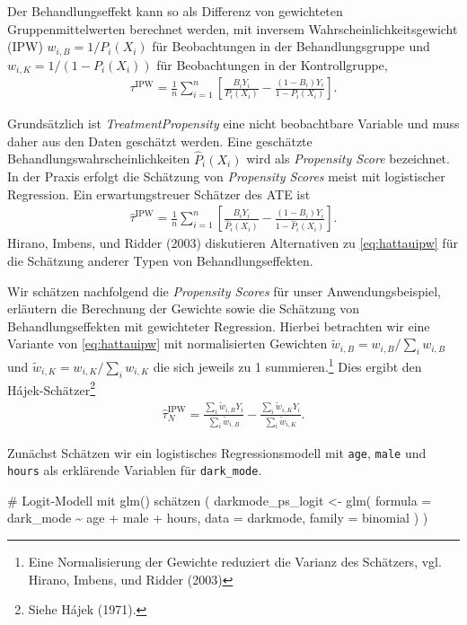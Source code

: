 \documentclass[
  a4paper,
  DIV=11,
  oneside]{scrreprt}
\newenvironment{Shaded}{\begin{snugshade}}{\end{snugshade}}
\newcommand{\AttributeTok}[1]{\textcolor[rgb]{0.40,0.45,0.13}{#1}}
\newcommand{\CommentTok}[1]{\textcolor[rgb]{0.37,0.37,0.37}{#1}}
\newcommand{\FunctionTok}[1]{\textcolor[rgb]{0.28,0.35,0.67}{#1}}
\newcommand{\NormalTok}[1]{\textcolor[rgb]{0.00,0.23,0.31}{#1}}
\newcommand{\OtherTok}[1]{\textcolor[rgb]{0.00,0.23,0.31}{#1}}
\newcommand{\SpecialCharTok}[1]{\textcolor[rgb]{0.37,0.37,0.37}{#1}}
\begin{document}
Der Behandlungseffekt kann so als Differenz von gewichteten
Gruppenmittelwerten berechnet werden, mit inversem
Wahrscheinlichkeitsgewicht (IPW) \(w_{i,B} = 1/P_i(X_i)\) für
Beobachtungen in der Behandlungsgruppe und \(w_{i,K} = 1/(1-P_i(X_i))\)
für Beobachtungen in der Kontrollgruppe, \begin{align}
  \tau^{\text{IPW}} = \frac{1}{n}\sum_{i=1}^n \left[\frac{B_i Y_i}{P_i(X_i)} - \frac{(1-B_i)Y_i}{1-P_i(X_i)} \right].\label{eq:tauipw}
\end{align}

Grundsätzlich ist \emph{TreatmentPropensity} eine nicht beobachtbare
Variable und muss daher aus den Daten geschätzt werden. Eine geschätzte
Behandlungswahrscheinlichkeiten \(\widehat{P}_i(X_i)\) wird als
\emph{Propensity Score} bezeichnet. In der Praxis erfolgt die Schätzung
von \emph{Propensity Scores} meist mit logistischer Regression. Ein
erwartungstreuer Schätzer des ATE ist \begin{align}
  \widehat{\tau}^{\text{IPW}} = \frac{1}{n}\sum_{i=1}^n \left[\frac{B_i Y_i}{\widehat{P}_i(X_i)} - \frac{(1-B_i)Y_i}{1-\widehat{P}_i(X_i)} \right].\label{eq:hattauipw}
\end{align} Hirano, Imbens, und Ridder (2003) diskutieren Alternativen
zu \eqref{eq:hattauipw} für die Schätzung anderer Typen von
Behandlungseffekten.

Wir schätzen nachfolgend die \emph{Propensity Scores} für unser
Anwendungsbeispiel, erläutern die Berechnung der Gewichte sowie die
Schätzung von Behandlungseffekten mit gewichteter Regression. Hierbei
betrachten wir eine Variante von \eqref{eq:hattauipw} mit normalisierten
Gewichten \(\tilde{w}_{i,B} = w_{i,B}/\sum_i w_{i,B}\) und
\(\tilde{w}_{i,K} = w_{i,K}/\sum_i w_{i,K}\) die sich jeweils zu 1
summieren.\footnote{Eine Normalisierung der Gewichte reduziert die
  Varianz des Schätzers, vgl. Hirano, Imbens, und Ridder (2003)} Dies
ergibt den Hájek-Schätzer\footnote{Siehe Hájek (1971).} \begin{align}
    \widehat{\tau}_N^{\text{IPW}} = \frac{\sum_i\tilde{w}_{i,B}Y_i}{\sum_i\tilde{w}_{i,B}} -  \frac{\sum_i\tilde{w}_{i,K}Y_i}{\sum_i\tilde{w}_{i,K}}.\label{eq:hattauhajek}
\end{align}

Zunächst Schätzen wir ein logistisches Regressionsmodell mit
\texttt{age}, \texttt{male} und \texttt{hours} als erklärende Variablen
für \texttt{dark\_mode}.

\begin{Shaded}
\begin{Highlighting}[]
\CommentTok{\# Logit{-}Modell mit \textquotesingle{}glm()\textquotesingle{} schätzen}
\NormalTok{(}
\NormalTok{  darkmode\_ps\_logit }\OtherTok{\textless{}{-}} \FunctionTok{glm}\NormalTok{(}
    \AttributeTok{formula =}\NormalTok{ dark\_mode }\SpecialCharTok{\textasciitilde{}}\NormalTok{ age }\SpecialCharTok{+}\NormalTok{ male }\SpecialCharTok{+}\NormalTok{ hours,}
    \AttributeTok{data =}\NormalTok{ darkmode,}
    \AttributeTok{family =}\NormalTok{ binomial}
\NormalTok{  )}
\NormalTok{)}
\end{Highlighting}
\end{Shaded}
\end{document}
